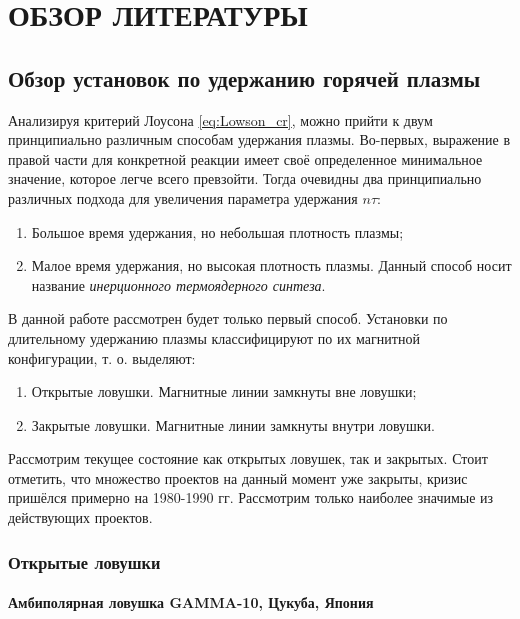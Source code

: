 \chapter{ОБЗОР ЛИТЕРАТУРЫ}\label{ch1}



\section{Обзор установок по удержанию горячей плазмы}

Анализируя критерий Лоусона \eqref{eq:Lowson_cr}, можно прийти к двум принципиально различным способам удержания плазмы. Во-первых, выражение в правой части для конкретной реакции имеет своё определенное минимальное значение, которое легче всего превзойти. Тогда очевидны два принципиально различных подхода для увеличения параметра удержания $n \tau$:
\begin{enumerate}
\item Большое время удержания, но небольшая плотность плазмы;
\item Малое время удержания, но высокая плотность плазмы. Данный способ носит название \textit{инерционного термоядерного синтеза}.
\end{enumerate}

В данной работе рассмотрен будет только первый способ. Установки по длительному удержанию плазмы классифицируют по их магнитной конфигурации, т. о. выделяют:
\begin{enumerate}
\item Открытые ловушки. Магнитные линии замкнуты вне ловушки;
\item Закрытые ловушки. Магнитные линии замкнуты внутри ловушки.
\end{enumerate}

Рассмотрим текущее состояние как открытых ловушек, так и закрытых. Стоит отметить, что множество проектов на данный момент уже закрыты, кризис пришёлся примерно на 1980-1990 гг. Рассмотрим только наиболее значимые из действующих проектов.

\subsection{Открытые ловушки}
\label{sec:open_trap}

\subsubsection{Амбиполярная ловушка GAMMA-10, Цукуба, Япония}

